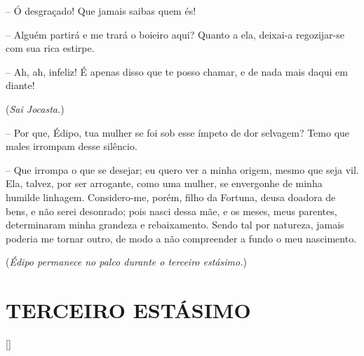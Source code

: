  --   Ó desgraçado! Que jamais saibas quem és!

 --    Alguém partirá e me trará o boieiro aqui? Quanto a ela, deixai-a
regozijar-se com sua rica estirpe.

 --   Ah, ah, infeliz! É apenas disso que te posso chamar, e de nada mais
daqui em diante!

(\emph{Sai Jocasta.})

 --   Por que, Édipo, tua mulher se foi sob esse ímpeto de dor selvagem? Temo
que males irrompam desse silêncio.

 --   Que irrompa o que se desejar; eu quero ver a minha origem, mesmo que
seja vil. Ela, talvez, por ser arrogante, como uma mulher, se envergonhe
de minha humilde  linhagem. Considero-me, porém, filho da Fortuna,
deusa doadora de bens, e não serei desonrado; pois nasci dessa mãe, e os
meses, meus parentes, determinaram minha grandeza e rebaixamento. Sendo
tal por natureza, jamais poderia me tornar outro, de modo a não
compreender a fundo o meu nascimento.

(\emph{Édipo permanece no palco durante o terceiro estásimo.})

\section{TERCEIRO ESTÁSIMO}


\hfill [] 

